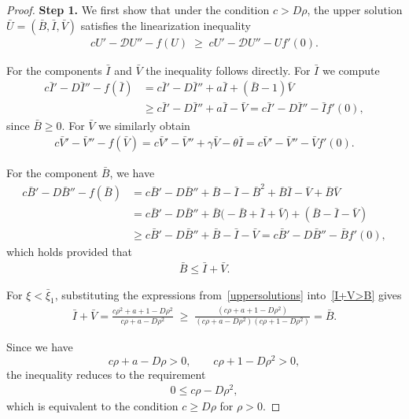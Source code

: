 \documentclass[10pt,a4paper]{amsart}
\begin{document}
\begin{proof} 
\textbf{Step 1.} We first show that under the condition $c > D\rho$, the upper solution 
$\bar{U} = (\bar{B}, \bar{I}, \bar{V})$ satisfies the linearization inequality
\begin{align}\label{linearization_inequality}
    cU' - \mathcal{D}U'' - f(U) \;\ge\; cU' - \mathcal{D}U'' - Uf'(0).
\end{align}

For the components $\bar{I}$ and $\bar{V}$ the inequality follows directly.  
For $\bar{I}$ we compute
\begin{align}
    c\bar{I}' - D\bar{I}'' - f(\bar{I})
    &= c\bar{I}' - D\bar{I}'' + a\bar{I} + (\bar{B}-1)\bar{V} \\
    &\ge c\bar{I}' - D\bar{I}'' + a\bar{I} - \bar{V}
      = c\bar{I}' - D\bar{I}'' - \bar{I}f'(0),
\end{align}
since $\bar{B} \ge 0$.  
For $\bar{V}$ we similarly obtain
\begin{align}
    c\bar{V}' - \bar{V}'' - f(\bar{V})
    = c\bar{V}' - \bar{V}'' + \gamma \bar{V} - \theta \bar{I}
    = c\bar{V}' - \bar{V}'' - \bar{V}f'(0).
\end{align}

For the component $\bar{B}$, we have
\begin{align}
    c\bar{B}' - D\bar{B}'' - f(\bar{B})
    &= c\bar{B}' - D\bar{B}'' 
    + \bar{B} - \bar{I} - \bar{B}^2 + \bar{B}\bar{I} - \bar{V} + \bar{B}\bar{V} \\
    &= c\bar{B}' - D\bar{B}'' 
       + \bar{B}\bigl(-\bar{B} + \bar{I} + \bar{V}\bigr)
       + (\bar{B}-\bar{I} - \bar{V}) \\
    &\ge c\bar{B}' - D\bar{B}'' + \bar{B} - \bar{I} - \bar{V}
      = c\bar{B}' - D\bar{B}'' - \bar{B}f'(0),
\end{align}
which holds provided that
\begin{align} \label{I+V>B}
    \bar{B} \le \bar{I} + \bar{V}.
\end{align}

For $\xi < \bar{\xi}_1$, substituting the expressions from~\eqref{uppersolutions} into~\eqref{I+V>B} gives
\begin{align}
    \bar{I} + \bar{V}
    = \frac{c\rho^{2}+a+1 - D\rho^2}{c\rho+a - D\rho^2}
    \;\ge\;
    \frac{(c\rho+a+1 - D\rho^2)}
         {(c\rho+a - D\rho^2)(c\rho+1 - D\rho^2)}=\bar{B}.
\end{align}

Since we have
\[
c\rho+a - D\rho > 0,
\qquad
c\rho+1 - D\rho^2 > 0,
\]
the inequality reduces to the requirement
\begin{align}\label{upper_requirement}
    0 \le c\rho - D\rho^{2},
\end{align}
which is equivalent to the condition $c \ge D\rho$ for $\rho>0$.


\end{proof}
\end{document}
